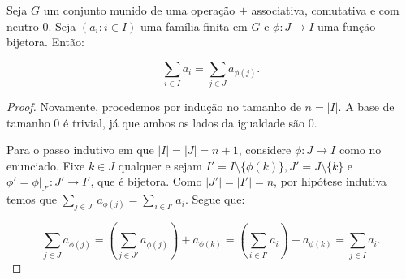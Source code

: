 \begin{prop}
    Seja $G$ um conjunto munido de uma operação $+$ associativa, comutativa e com neutro $0$.
Seja $(a_i: i \in I)$ uma família finita em $G$ e $\phi:J\rightarrow I$ uma função bijetora.
Então:

    \[\sum_{i \in I}a_i=\sum_{j \in J}a_{\phi(j)}.\]

\end{prop}
\begin{proof}
Novamente, procedemos por indução no tamanho de $n=|I|$.
A base de tamanho $0$ é trivial, já que ambos os lados da igualdade são $0$.

Para o passo indutivo em que $|I|=|J|=n+1$, considere $\phi:J\rightarrow I$ como no enunciado.
Fixe $k \in J$ qualquer e sejam $I'=I\setminus\{\phi(k)\}, J'=J\setminus\{k\}$ e $\phi'=\phi|_{J'}:J'\rightarrow I'$, que é bijetora.
Como $|J'|=|I'|=n$, por hipótese indutiva temos que $\sum_{j \in J'}a_{\phi(j)}=\sum_{i \in I'}a_i$.
Segue que:

\[\sum_{j \in J}a_{\phi(j)}=\left(\sum_{j \in J'}a_{\phi(j)}\right)+a_{\phi(k)}=\left(\sum_{i \in I'}a_{i}\right)+a_{\phi(k)}=\sum_{j \in I}a_{i}.\]
\end{proof}
